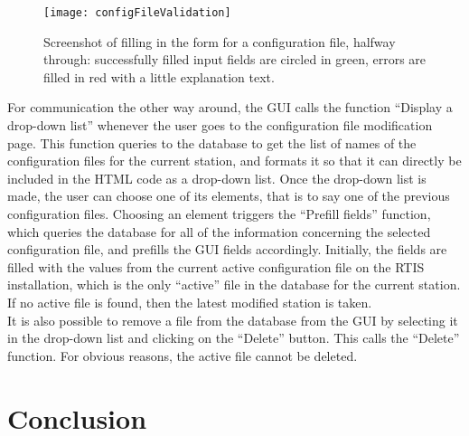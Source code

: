 \documentclass{themeensg}
\begin{document}
\begin{figure}[ht]
	\centering
	\texttt{[image: configFileValidation]}
	\caption{Screenshot of filling in the form for a configuration file, halfway through: successfully filled input fields are circled in green, errors are filled in red with a little explanation text.}
\end{figure}

For communication the other way around, the GUI calls the function “Display a drop-down list” whenever the user goes to the configuration file modification page. This function queries to the database to get the list of names of the configuration files for the current station, and formats it so that it can directly be included in the HTML code as a drop-down list. Once the drop-down list is made, the user can choose one of its elements, that is to say one of the previous configuration files. Choosing an element triggers the “Prefill fields” function, which queries the database for all of the information concerning the selected configuration file, and prefills the GUI fields accordingly. Initially, the fields are filled with the values from the current active configuration file on the RTIS installation, which is the only “active” file in the database for the current station. If no active file is found, then the latest modified station is taken.\\
It is also possible to remove a file from the database from the GUI by selecting it in the drop-down list and clicking on the “Delete” button. This calls the “Delete” function. For obvious reasons, the active file cannot be deleted.

\newevenpage
\chapter*{Conclusion}
  \vspace{1.5cm}

\newevenpage
\begin{appendices} 
\label{beginappendices}

\label{configfile}



\end{appendices}
\end{document}
